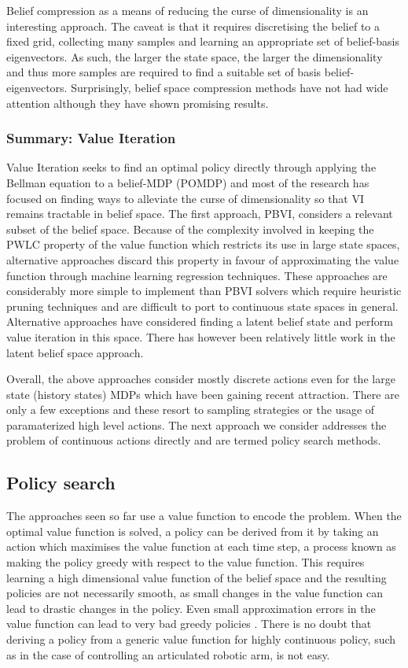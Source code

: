 Belief compression as a means of reducing the curse of dimensionality is an interesting approach. The 
caveat is that it requires discretising the belief to a fixed grid, collecting many samples and learning an 
appropriate set of belief-basis eigenvectors. As such, the larger the state space, the larger the dimensionality and thus more
samples are required to find a suitable set of basis belief-eigenvectors. Surprisingly, belief space compression 
methods have not had wide attention although they have shown promising results.


\subsubsection{Summary: Value Iteration}

Value Iteration seeks to find an optimal policy directly through applying the Bellman equation to a belief-MDP (POMDP)
and most of the research has focused on finding ways to alleviate the curse of dimensionality so that VI remains tractable 
in belief space. The first approach, PBVI, considers a relevant subset of the belief space. Because 
of the complexity involved in keeping the PWLC property of the value function which restricts its use in large state 
spaces, alternative approaches discard this property in favour of approximating the value function through machine learning
regression techniques. These approaches are considerably more simple to implement than PBVI solvers which require heuristic pruning 
techniques and are difficult to port to continuous state spaces in general. Alternative approaches have considered finding a latent
belief state and perform value iteration in this space. There has however been relatively little work in the latent belief space approach.

Overall, the above approaches consider mostly discrete actions even for the large state (history states) MDPs
which have been gaining recent attraction. There are only a few exceptions and these resort to sampling strategies 
or the usage of paramaterized high level actions. The next approach we consider addresses the problem of continuous
actions directly and are termed policy search methods.

\subsection{Policy search}\label{lit:policy_search}

The approaches seen so far use a value function to encode the problem. When the optimal value function is solved, a policy 
can be derived from it by taking an action which maximises the value function at each time step, a process known as making 
the policy greedy with respect to the value function. This requires learning a high dimensional value function of the belief 
space and the resulting policies are not necessarily 
smooth, as small changes in the value function can lead to drastic changes in the policy. Even small 
approximation errors in the value function can lead to very bad greedy policies \citep{gpomdp_2000}. 
There is no doubt that deriving a policy from a generic value function for highly continuous policy, such as in the case 
of controlling an articulated robotic arm, is not easy. 

